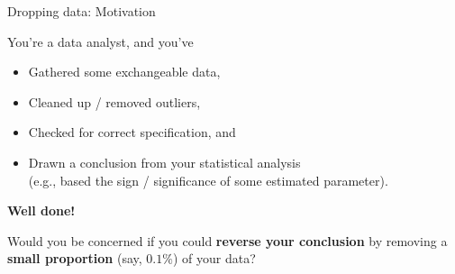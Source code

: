\begin{frame}{Dropping data: Motivation}

You're a data analyst, and you've

\begin{itemize}
    \item Gathered some exchangeable data,
    \item Cleaned up / removed outliers,
    \item Checked for correct specification, and
    \item Drawn a conclusion from your statistical analysis \\(e.g., based
    the sign / significance of some estimated parameter).
\end{itemize}

\pause
\textbf{Well done!}

Would you be concerned if you could \textbf{reverse your conclusion} by removing
a \textbf{small proportion} (say, $0.1\%$) of your data?

\end{frame}


